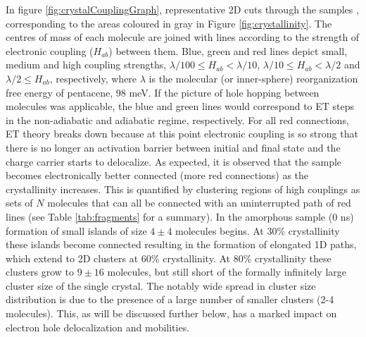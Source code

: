 \noindent In figure \ref{fig:crystalCouplingGraph}, representative 2D cuts through the samples , corresponding to the areas coloured in gray
in Figure \ref{fig:crystallinity}. The centres of mass of each molecule are joined with lines according to 
the strength of electronic coupling ($H_{ab}$) between them. Blue, green and red lines depict small, medium and high coupling strengths,  
$\lambda/100 \le H_{ab} < \lambda/10$,  $\lambda/10 \le H_{ab} < \lambda/2$ and $\lambda/2 \le H_{ab}$, respectively, where $\lambda$ is the molecular (or inner-sphere) 
reorganization free energy of pentacene, 98 meV.  If the picture of hole hopping between molecules was applicable, the blue and green lines would correspond to 
ET steps in the non-adiabatic and adiabatic regime, respectively. For all red connections, ET theory breaks down because at this point electronic coupling is so strong 
that there is no longer an activation barrier between initial and final state and the charge carrier starts to delocalize\cite{C6FD00107F}. As expected, it is observed that  
the sample becomes electronically better connected (more red connections) as the crystallinity increases.  
This is quantified by clustering regions of high couplings as sets of $N$ molecules that can all be connected with an uninterrupted path of red lines (see Table \ref{tab:fragments} for a summary).
In the amorphous sample (0 ns) formation of small islands of size $4\pm4$ molecules begins. At 30\% crystallinity these islands become connected resulting in the formation of 
elongated 1D paths, which extend to 2D clusters at 60\% crystallinity. At 80\% crystallinity these clusters grow to $9\pm16$ molecules, but still short of the formally infinitely 
large cluster size of the single crystal. The notably wide spread in cluster size distribution is due to the presence of a large number of smaller clusters (2-4 molecules). 
This, as will be discussed further below, has a marked impact on electron hole delocalization and mobilities. \\
\\
